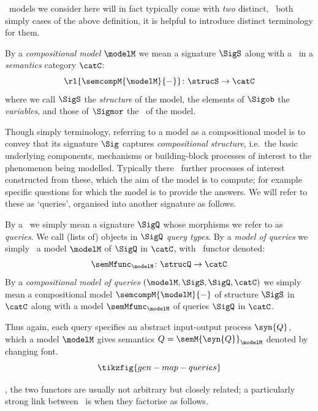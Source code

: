 \documentclass{article}
\begin{document}
\ models we consider here will in fact typically come with \emph{two} distinct, \ both simply cases of the above definition, it is helpful to introduce distinct terminology for them. 


\begin{definition}
By a \emph{compositional model} $\modelM$ we mean a signature $\SigS$ along with a 
\ in a \emph{semantics} category $\catC$:
\[
\rl{\semcompM{\modelM}{-}} \colon \strucS \to \catC
\] 
where we call $\SigS$ the \emph{structure} of the model, the elements of $\Sigob$ the \emph{variables}, and those of $\Sigmor$ the \ of the model. 
\end{definition} 

Though simply terminology, referring to a model as a compositional model is to convey that its signature $\Sig$ captures \emph{compositional structure}, i.e.~the basic underlying components, mechanisms or building-block processes of interest to the phenomenon being modelled. Typically there \ further processes of interest constructed from these, which the aim of the model is to compute; for example specific questions for which the model is to provide the answers. We will refer to these as `queries', organised into another signature as follows. 

\begin{definition}
By a \ we simply mean a signature $\SigQ$ whose morphisms we refer to as \emph{queries}. We call (lists of) objects in $\SigQ$ \emph{query types}. By a \emph{model of queries} we simply \ a model $\modelM$ of $\SigQ$ in $\catC$, with \ functor denoted:
\[
\semMfunc_{\modelM} \colon \strucQ \to \catC
\]
By a \emph{compositional model of queries} $(\modelM, \SigS, \SigQ, \catC)$ we simply mean a compositional model $\semcompM{\modelM}{-}$ of structure $\SigS$ in $\catC$ along with a model $\semMfunc_{\modelM}$ of queries $\SigQ$ in $\catC$. 
\end{definition}


Thus again, each query specifies an abstract input-output process $\syn{Q}$, which a model $\modelM$ gives semantics $Q=\semM{\syn{Q}}_\modelM$ denoted by changing font. 
\[
\tikzfig{gen-map-queries}
\]

, 
the two functors are usually not arbitrary but closely related; a particularly strong link between \ is when they factorise as follows.
\end{document}
